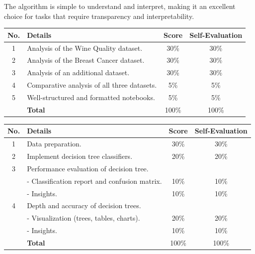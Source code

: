 \documentclass{article}
\begin{document}
The algorithm is simple to understand and interpret, making it an excellent choice for tasks that require transparency and interpretability.

\newpage
{}

\begin{table}[H]
    \centering
    \begin{tabular}{|c|p{9cm}|c|c|}
    \hline
    \textbf{No.} & \textbf{Details} & \textbf{Score} & \textbf{Self-Evaluation} \\
    \hline
    1 & Analysis of the Wine Quality dataset.  & 30\% & 30\%\\
    \hline
    2 & Analysis of the Breast Cancer dataset. & 30\% & 30\%\\
    \hline
    3 & Analysis of an additional dataset. & 30\% & 30\%\\
    \hline
    4 & Comparative analysis of all three datasets. & 5\% & 5\%\\
    \hline
    5 & Well-structured and formatted notebooks. & 5\% & 5\%\\
    \hline
    & \textbf{Total} & 100\% & 100\% \\
    \hline
    \end{tabular}
    \end{table}
    
\begin{table}[H]
    \centering
    \begin{tabular}{|c|p{9cm}|c|c|}
    \hline
    \textbf{No.} & \textbf{Details} & \textbf{Score} & \textbf{Self-Evaluation} \\
    \hline
    1 & Data preparation.  & 30\% & 30\%\\
    \hline
    2 & Implement decision tree classifiers. & 20\% & 20\%\\
    \hline
    3 & Performance evaluation of decision tree. &  & \\
    \hline
    & - Classification report and confusion matrix. & 10\% & 10\%\\
    \hline
    & - Insights. & 10\% & 10\%\\
    \hline
    4 & Depth and accuracy of decision trees. &  & \\
    \hline
    & - Visualization (trees, tables, charts). & 20\% & 20\%\\
    \hline
    & - Insights. & 10\% & 10\%\\
    \hline
    & \textbf{Total} & 100\% & 100\% \\
    \hline
    \end{tabular}
\end{table}
    
\end{document}
